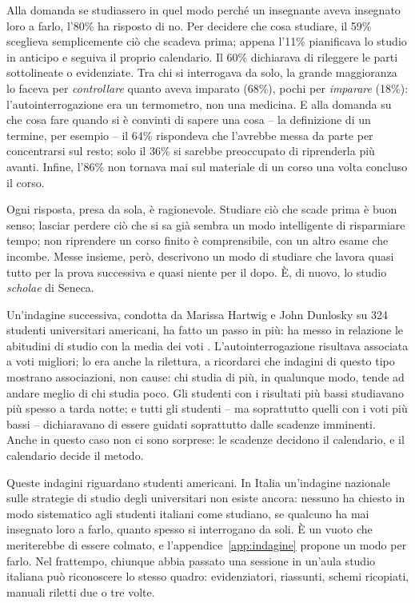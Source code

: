 Alla domanda se studiassero in quel modo perché un insegnante aveva
insegnato loro a farlo, l'80\% ha risposto di no. Per decidere che cosa
studiare, il 59\% sceglieva semplicemente ciò che scadeva prima;
appena l'11\% pianificava lo studio in anticipo e seguiva il proprio
calendario. Il 60\% dichiarava di rileggere le parti sottolineate o
evidenziate. Tra chi si interrogava da solo, la grande maggioranza lo
faceva per \emph{controllare} quanto aveva imparato (68\%), pochi per
\emph{imparare} (18\%): l'autointerrogazione era un termometro, non una
medicina. E alla domanda su che cosa fare quando si è convinti di
sapere una cosa -- la definizione di un termine, per esempio -- il 64\%
rispondeva che l'avrebbe messa da parte per concentrarsi sul resto;
solo il 36\% si sarebbe preoccupato di riprenderla più avanti. Infine,
l'86\% non tornava mai sul materiale di un corso una volta concluso il
corso.

Ogni risposta, presa da sola, è ragionevole. Studiare ciò che scade
prima è buon senso; lasciar perdere ciò che si sa già sembra un modo
intelligente di risparmiare tempo; non riprendere un corso finito è
comprensibile, con un altro esame che incombe. Messe insieme, però,
descrivono un modo di studiare che lavora quasi tutto per la prova
successiva e quasi niente per il dopo. È, di nuovo, lo studio
\emph{scholae} di Seneca.

Un'indagine successiva, condotta da Marissa Hartwig e John Dunlosky su
324 studenti universitari americani, ha fatto un passo in più: ha messo
in relazione le abitudini di studio con la media dei voti
\parencite{hartwig2012}. L'autointerrogazione risultava associata a
voti migliori; lo era anche la rilettura, a ricordarci che indagini di
questo tipo mostrano associazioni, non cause: chi studia di più, in
qualunque modo, tende ad andare meglio di chi studia poco. Gli studenti con i risultati più bassi studiavano più
spesso a tarda notte; e tutti gli studenti -- ma soprattutto quelli con
i voti più bassi -- dichiaravano di essere guidati soprattutto dalle
scadenze imminenti. Anche in questo caso non ci sono sorprese: le
scadenze decidono il calendario, e il calendario decide il metodo.

Queste indagini riguardano studenti americani. In Italia un'indagine
nazionale sulle strategie di studio degli universitari non esiste
ancora: nessuno ha chiesto in modo sistematico agli studenti italiani
come studiano, se qualcuno ha mai insegnato loro a farlo, quanto spesso
si interrogano da soli. È un vuoto che meriterebbe di essere colmato,
e l'appendice~\ref{app:indagine} propone un modo per farlo. Nel
frattempo, chiunque abbia passato una sessione in un'aula studio
italiana può riconoscere lo stesso quadro: evidenziatori, riassunti,
schemi ricopiati, manuali riletti due o tre volte.

